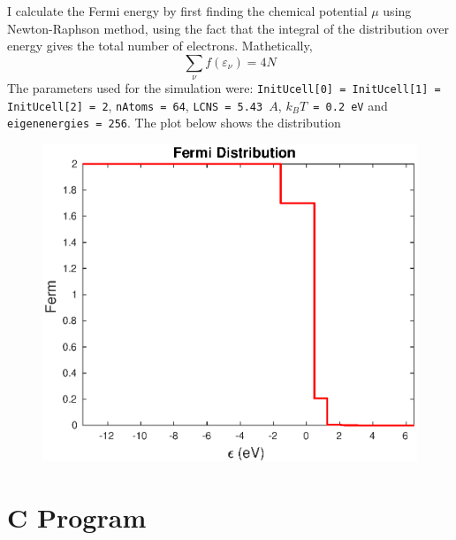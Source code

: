 \documentclass[11pt, oneside]{article}   	%
\begin{document}
I calculate the Fermi energy by first finding the chemical potential $\mu$ using Newton-Raphson method, using the fact that the integral of the distribution over energy gives the total number of electrons. Mathetically,
	\begin{equation}
	\sum \limits_\nu f({\varepsilon_\nu}) = 4N
	\end{equation}
The parameters used for the simulation were: \texttt{InitUcell[0] = InitUcell[1] = InitUcell[2] = 2}, \texttt{nAtoms = 64}, \texttt{LCNS = 5.43 $A$}, \texttt{$k_BT$ = 0.2 eV} and \texttt{eigenenergies = 256}.
The plot below shows the distribution
	\begin{figure}[!htbp]
	\centering
	\includegraphics[scale=0.5]{fermiDist.eps}
	\end{figure}

\pagebreak
\appendix
\section{C Program}


\end{document}

